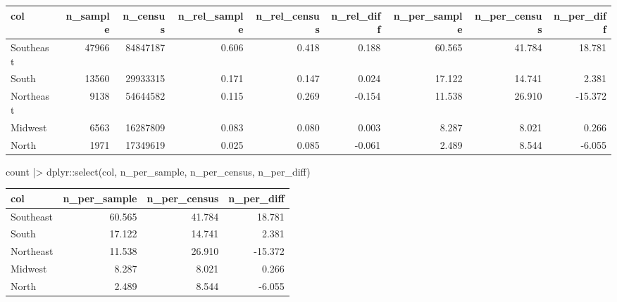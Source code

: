 \documentclass[
  12pt,
  a4paper,
  oneside]{tesesusp}
\newenvironment{Shaded}{\begin{snugshade}}{\end{snugshade}}
\newcommand{\CommentTok}[1]{\textcolor[rgb]{0.37,0.37,0.37}{#1}}
\newcommand{\FunctionTok}[1]{\textcolor[rgb]{0.28,0.35,0.67}{#1}}
\newcommand{\NormalTok}[1]{\textcolor[rgb]{0.00,0.23,0.31}{#1}}
\newcommand{\SpecialCharTok}[1]{\textcolor[rgb]{0.37,0.37,0.37}{#1}}
\begin{document}
\begin{table}
\centering
\begin{tabular}{l|r|r|r|r|r|r|r|r}
\hline
col & n\_sample & n\_census & n\_rel\_sample & n\_rel\_census & n\_rel\_diff & n\_per\_sample & n\_per\_census & n\_per\_diff\\
\hline
Southeast & 47966 & 84847187 & 0.606 & 0.418 & 0.188 & 60.565 & 41.784 & 18.781\\
\hline
South & 13560 & 29933315 & 0.171 & 0.147 & 0.024 & 17.122 & 14.741 & 2.381\\
\hline
Northeast & 9138 & 54644582 & 0.115 & 0.269 & -0.154 & 11.538 & 26.910 & -15.372\\
\hline
Midwest & 6563 & 16287809 & 0.083 & 0.080 & 0.003 & 8.287 & 8.021 & 0.266\\
\hline
North & 1971 & 17349619 & 0.025 & 0.085 & -0.061 & 2.489 & 8.544 & -6.055\\
\hline
\end{tabular}
\end{table}

\begin{Shaded}
\begin{Highlighting}[numbers=left,,]
\NormalTok{count }\SpecialCharTok{|\textgreater{}}\NormalTok{ dplyr}\SpecialCharTok{::}\FunctionTok{select}\NormalTok{(col, n\_per\_sample, n\_per\_census, n\_per\_diff)}
\end{Highlighting}
\end{Shaded}

\begin{table}
\centering
\begin{tabular}{l|r|r|r}
\hline
col & n\_per\_sample & n\_per\_census & n\_per\_diff\\
\hline
Southeast & 60.565 & 41.784 & 18.781\\
\hline
South & 17.122 & 14.741 & 2.381\\
\hline
Northeast & 11.538 & 26.910 & -15.372\\
\hline
Midwest & 8.287 & 8.021 & 0.266\\
\hline
North & 2.489 & 8.544 & -6.055\\
\hline
\end{tabular}
\end{table}

\begin{Shaded}
\end{Shaded}
\end{document}
